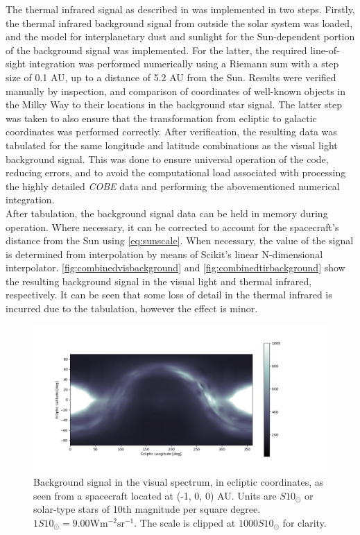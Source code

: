 The thermal infrared signal as described in \cite{IRDust} was implemented in two steps. Firstly, the thermal infrared background signal from outside the solar system was loaded, and the model for interplanetary dust and sunlight for the Sun-dependent portion of the background signal was implemented. For the latter, the required line-of-sight integration was performed numerically using a Riemann sum with a step size of 0.1 AU, up to a distance of 5.2 AU from the Sun. Results were verified manually by inspection, and comparison of coordinates of well-known objects in the Milky Way to their locations in the background star signal. The latter step was taken to also ensure that the transformation from ecliptic to galactic coordinates was performed correctly. After verification, the resulting data was tabulated for the same longitude and latitude combinations as the visual light background signal. This was done to ensure universal operation of the code, reducing errors, and to avoid the computational load associated with processing the highly detailed \textit{COBE} data and performing the abovementioned numerical integration. \\

After tabulation, the background signal data can be held in memory during operation. Where necessary, it can be corrected to account for the spacecraft's distance from the Sun using \autoref{eq:sunscale}. When necessary, the value of the signal is determined from interpolation by means of Scikit's linear N-dimensional interpolator. \autoref{fig:combinedvisbackground} and \autoref{fig:combinedtirbackground} show the resulting background signal in the visual light and thermal infrared, respectively. It can be seen that some loss of detail in the thermal infrared is incurred due to the tabulation, however the effect is minor.

\begin{figure}[htbp]
 \centering
 \includegraphics[width=1.0\textwidth]{img/background_vis_combined.png}
 \caption{Background signal in the visual spectrum, in ecliptic coordinates, as seen from a spacecraft located at (-1, 0, 0) AU. Units are $S10_\odot$ or solar-type stars of 10th magnitude per square degree. $1S10_\odot = 9.00\mathrm{W}\mathrm{m}^{-2}\mathrm{sr}^{-1}$. The scale is clipped at $1000 S10_\odot$ for clarity.}
 \label{fig:combinedvisbackground}
\end{figure}

